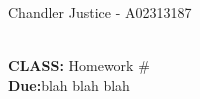 \documentclass[10pt]{article}
\begin{document}
\begin{flushright}
Chandler Justice - A02313187
\end{flushright}
\noindent \underline{\hspace{3in}}\\
\textbf{CLASS:} Homework \#\\
\textbf{Due:}blah blah blah\\

\noindent \underline{\hspace{3in}}\\
\end{document}

